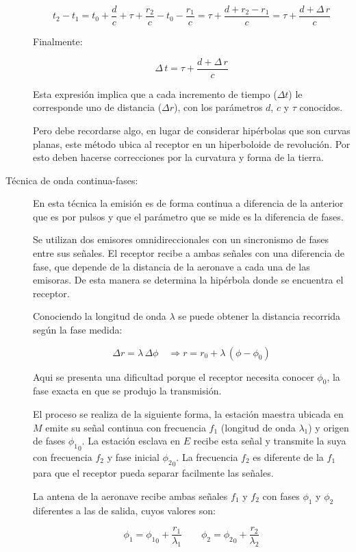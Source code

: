 \begin{description}
\[
t_2-t_1 = t_0 + \displaystyle \frac{d}{c}+\tau+\frac{r_2}{c} - t_0 -\frac{r_1}{c} = \tau+\frac{d+r_2-r_1}{c} = \tau+\frac{d+\Delta\,r}{c}
\]

Finalmente:

\[
\Delta\,t = \tau+\frac{d+\Delta\,r}{c}
\]

Esta expresi\'on implica que a cada incremento de tiempo ($\Delta t$) le corresponde uno de distancia ($\Delta r$), con los par\'ametros $d$, $c$ y $\tau$ conocidos.

Pero debe recordarse algo, en lugar de considerar hip\'erbolas que son curvas planas, este m\'etodo ubica al receptor en un hiperboloide de revoluci\'on. Por esto deben hacerse correcciones por la curvatura y forma de la tierra.


\item [T\'ecnica de onda continua-fases:]

En esta t\'ecnica la emisi\'on es de forma continua a diferencia de la anterior que es por pulsos y que el par\'ametro que se mide es la diferencia de fases.

Se utilizan dos emisores omnidireccionales con un sincronismo de fases entre sus se\~nales. El receptor recibe a ambas se\~nales con una diferencia de fase, que depende de la distancia de la aeronave a cada una de las emisoras. De esta manera se determina la hip\'erbola donde se encuentra el receptor.

Conociendo la longitud de onda $\lambda$ se puede obtener la distancia recorrida seg\'un la fase medida: 

\[\Delta r = \lambda \,\Delta \phi \quad \Longrightarrow r = r_0 +\lambda \,\left( \phi - \phi_0 \right) \]

Aqui se presenta una dificultad porque el receptor necesita conocer $ \phi_0$, la fase exacta en que se produjo la transmisi\'on.

El proceso se realiza de la siguiente forma, la estaci\'on maestra ubicada en $M$ emite su se\~nal continua con frecuencia $f_1$ (longitud de onda $\lambda_1$) y origen de fases $ {\phi_1}_0$. La estaci\'on esclava en $E$ recibe esta se\~nal y transmite la suya con frecuencia $f_2$ y fase inicial $ {\phi_2}_0$. La frecuencia $f_2$ es diferente de la $f_1$ para que el receptor pueda separar facilmente las se\~nales.

La antena de la aeronave recibe ambas se\~nales $f_1$ y $f_2$ con fases $\phi_1$ y $\phi_2$ diferentes a las de salida, cuyos valores son:

\[
\phi_1 = {\phi_1}_0 + \displaystyle \frac{r_1}{\lambda_1} \qquad
\phi_2 = {\phi_2}_0 + \displaystyle \frac{r_2}{\lambda_2} 
\]


\end{description}
